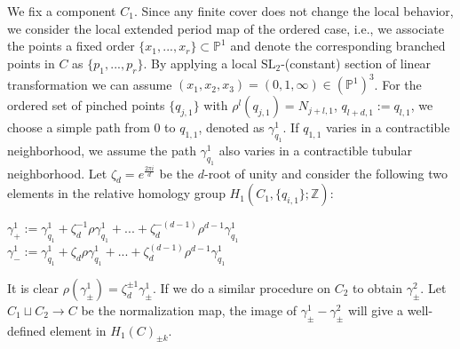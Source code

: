 \documentclass[12pt, letterpaper]{amsart}
\theoremstyle{plain}
\theoremstyle{definition}
\begin{document}
We fix a component $C_1$. Since any finite cover does not change the local behavior, we consider the local extended period map of the ordered case, i.e., we associate the points a fixed order $\{x_1,...,x_r\}\subset \mathbb{P}^1$ and denote the corresponding branched points in $C$ as $\{p_1,...,p_r\}$. By applying a local $\mathrm{SL}_2$-(constant) section of linear transformation we can assume $(x_1,x_2,x_3)=(0,1,\infty)\in (\mathbb{P}^1)^3$. For the ordered set of pinched points $\{q_{j,1}\}$ with $\rho^l(q_{j,1})=N_{j+l,1}$, $q_{l+d,1}:=q_{l,1}$, we choose a simple path from $0$ to $q_{1,1}$, denoted as $\gamma^1_{q_1}$. If $q_{1,1}$ varies in a contractible neighborhood, we assume the path $\gamma^1_{q_1}$ also varies in a contractible tubular neighborhood. 
Let $\zeta_d=e^{\frac{2\pi i}{d}}$ be the $d$-root of unity and consider the following two elements in the relative homology group $H_1(C_1,\{q_{i,1}\};\mathbb{Z})$:
\begin{center}
$\gamma^1_+:=\gamma^1_{q_1}+\zeta_d^{-1}\rho \gamma^1_{q_1}+...+\zeta_d^{-(d-1)}\rho^{d-1} \gamma^1_{q_1}$
\\

$\gamma^1_-:=\gamma^1_{q_1}+\zeta_d^{}\rho \gamma^1_{q_1}+...+\zeta_d^{(d-1)}\rho^{d-1} \gamma^1_{q_1}$
\end{center}
It is clear $\rho(\gamma^1_{\pm})=\zeta_d^{\pm 1}\gamma^1_{\pm}$. If we do a similar procedure on $C_2$ to obtain $\gamma^2_{\pm}$.
Let $C_1 \sqcup C_2  \to C$ be the normalization map, the image
 of $\gamma^1_{\pm}-\gamma^2_{\pm}$ will give a well-defined element in $H_1(C)_{\pm k}$.
\end{document}
